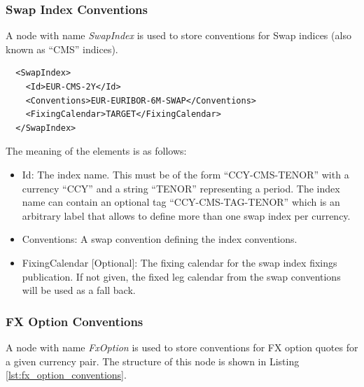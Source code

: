 \subsubsection{Swap Index Conventions}

A node with name \emph{SwapIndex} is used to store conventions for Swap indices (also known as ``CMS'' indices).

\begin{listing}[H]
\begin{verbatim}
  <SwapIndex>
    <Id>EUR-CMS-2Y</Id>
    <Conventions>EUR-EURIBOR-6M-SWAP</Conventions>
    <FixingCalendar>TARGET</FixingCalendar>
  </SwapIndex>
\end{verbatim}
\caption{Swap index convention}
\label{lst:swap_index_conventions}
\end{listing}

The meaning of the elements is as follows:

\begin{itemize}
\item Id: The index name. This must be of the form ``CCY-CMS-TENOR'' with a currency ``CCY'' and a string ``TENOR''
  representing a period. The index name can contain an optional tag ``CCY-CMS-TAG-TENOR'' which is an arbitrary label
  that allows to define more than one swap index per currency.
\item Conventions: A swap convention defining the index conventions.
\item FixingCalendar [Optional]: The fixing calendar for the swap index fixings publication. If not given, the fixed leg
  calendar from the swap conventions will be used as a fall back.
\end{itemize}

\subsubsection{FX Option Conventions}\label{sss:fx_option_conv}
A node with name \emph{FxOption} is used to store conventions for FX option quotes for a given currency pair. The
structure of this node is shown in Listing \ref{lst:fx_option_conventions}.

